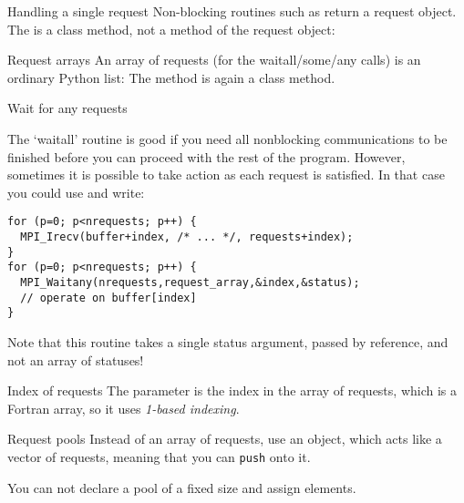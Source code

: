 \begin{pythonnote}{Handling a single request}
  Non-blocking routines such as 
  return a request object.
  The  is a class method,
  not a method of the request object:
\end{pythonnote}

\begin{pythonnote}{Request arrays}
  An array of requests (for the waitall/some/any calls)
  is an ordinary Python list:
  The  method is again a class method.
\end{pythonnote}

 {Wait for any requests}

The `waitall' routine is good if you need all nonblocking
communications to be finished before you can proceed with the rest of
the program. However, sometimes it is possible to take action as each
request is satisfied. In that case you could use
 and write:

\begin{lstlisting}
for (p=0; p<nrequests; p++) {
  MPI_Irecv(buffer+index, /* ... */, requests+index);
}
for (p=0; p<nrequests; p++) {
  MPI_Waitany(nrequests,request_array,&index,&status);
  // operate on buffer[index]
}
\end{lstlisting}

Note that this routine takes a single status argument, passed by
reference, and not an array of statuses!

\begin{fortrannote}{Index of requests}
  The  parameter is the index in the array of requests,
  which is a Fortran array,
  so it uses \emph{1-based indexing}.

\end{fortrannote}

\begin{mplnote}{Request pools}
  \label{mpl:req_pool}
  Instead of an array of requests,
  use an  object,
  which acts like a vector of requests,
  meaning that you can \lstinline+push+ onto it.


  You can not declare a pool of a fixed size and assign elements.
\end{mplnote}

